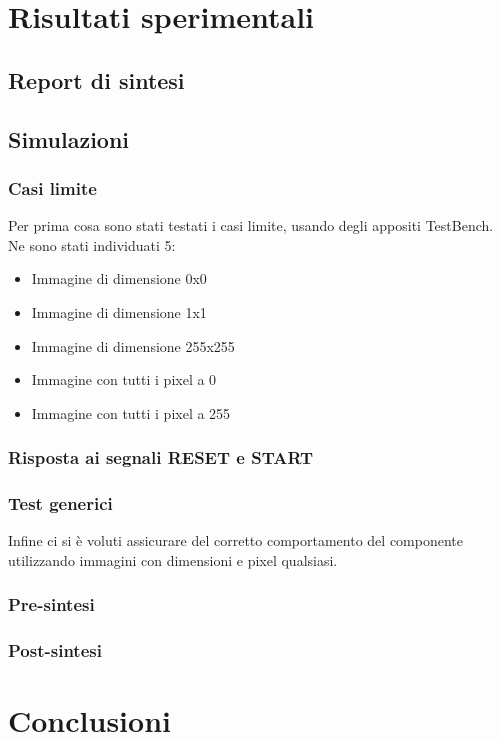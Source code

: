 \documentclass[a4paper, 12pt]{article}
\begin{document}
\newpage
\section{Risultati sperimentali}
\subsection{Report di sintesi}

\subsection{Simulazioni}

\subsubsection{Casi limite}
Per prima cosa sono stati testati i casi limite, usando degli appositi TestBench.
Ne sono stati individuati 5:
\begin{itemize}
    \item Immagine di dimensione 0x0
    \item Immagine di dimensione 1x1
    \item Immagine di dimensione 255x255
    \item Immagine con tutti i pixel a 0
    \item Immagine con tutti i pixel a 255
\end{itemize}

\subsubsection{Risposta ai segnali RESET e START}

\subsubsection{Test generici}
Infine ci si è voluti assicurare del corretto comportamento del componente utilizzando immagini con dimensioni e pixel qualsiasi.

\subsubsection{Pre-sintesi}

\subsubsection{Post-sintesi}

\newpage
\section{Conclusioni}
\end{document}
